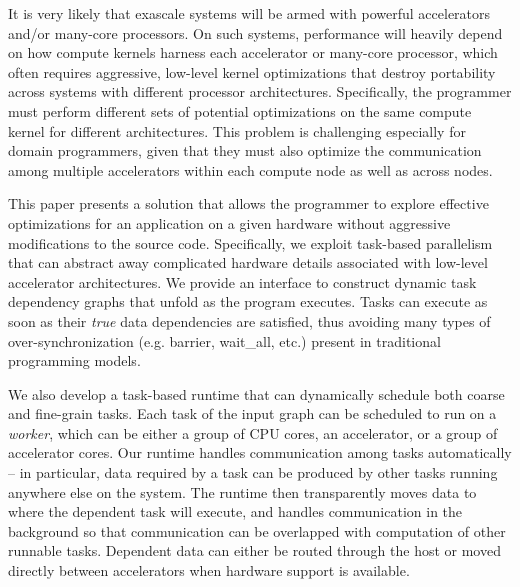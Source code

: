 It is very likely that exascale systems will be armed with powerful accelerators and/or many-core processors.%
On such systems, performance will heavily depend on how compute kernels harness each accelerator or many-core processor, which often requires aggressive, low-level kernel optimizations that destroy portability across systems with different processor architectures.
Specifically, the programmer must perform different sets of potential optimizations on the same compute kernel for different architectures.
This problem is challenging especially for domain programmers, given that they must also optimize the communication among multiple accelerators within each compute node as well as across nodes.

This paper presents a solution that allows the programmer to explore effective optimizations for an application on a given hardware without aggressive modifications to the source code. 
Specifically, we exploit task-based parallelism that can abstract away complicated hardware details associated with low-level accelerator architectures.
We provide an interface to construct dynamic task dependency graphs that unfold as the program executes. 
Tasks can execute as soon as their {\em true} data dependencies are satisfied, thus avoiding many types of over-synchronization (e.g. barrier, wait\_all, etc.) present in traditional programming models.

We also develop a task-based runtime that can dynamically schedule both coarse and fine-grain tasks.
Each task of the input graph can be scheduled to run on a {\em worker}, which can be either a group of CPU cores, an accelerator, or a group of accelerator cores.
Our runtime handles communication among tasks automatically -- in particular, data required by a task can be produced by other tasks running anywhere else on the system.
The runtime then transparently moves data to where the dependent task will execute, and handles communication in the background so that communication can be overlapped with computation of other runnable tasks.
Dependent data can either be routed through the host or moved directly between accelerators when hardware support is available.


